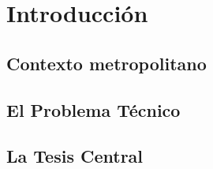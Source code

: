 
\section{Introducción}
\label{section:introduccion}


\subsection{Contexto metropolitano}
\label{subsection:contexto-metropolitano}


\subsection{El Problema Técnico}
\label{subsection:problema-tecnico}

\subsection{La Tesis Central}
\label{subsection:tesis-central}

